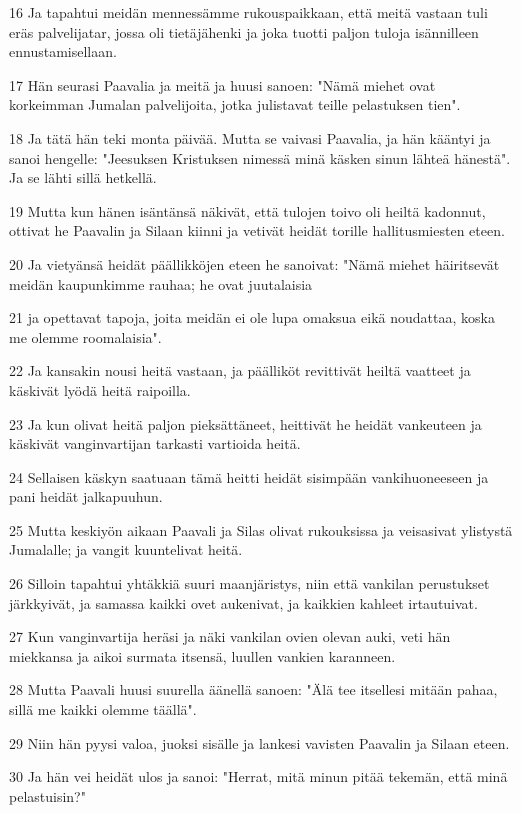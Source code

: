 \par 16 Ja tapahtui meidän mennessämme rukouspaikkaan, että meitä vastaan tuli eräs palvelijatar, jossa oli tietäjähenki ja joka tuotti paljon tuloja isännilleen ennustamisellaan.
\par 17 Hän seurasi Paavalia ja meitä ja huusi sanoen: "Nämä miehet ovat korkeimman Jumalan palvelijoita, jotka julistavat teille pelastuksen tien".
\par 18 Ja tätä hän teki monta päivää. Mutta se vaivasi Paavalia, ja hän kääntyi ja sanoi hengelle: "Jeesuksen Kristuksen nimessä minä käsken sinun lähteä hänestä". Ja se lähti sillä hetkellä.
\par 19 Mutta kun hänen isäntänsä näkivät, että tulojen toivo oli heiltä kadonnut, ottivat he Paavalin ja Silaan kiinni ja vetivät heidät torille hallitusmiesten eteen.
\par 20 Ja vietyänsä heidät päällikköjen eteen he sanoivat: "Nämä miehet häiritsevät meidän kaupunkimme rauhaa; he ovat juutalaisia
\par 21 ja opettavat tapoja, joita meidän ei ole lupa omaksua eikä noudattaa, koska me olemme roomalaisia".
\par 22 Ja kansakin nousi heitä vastaan, ja päälliköt revittivät heiltä vaatteet ja käskivät lyödä heitä raipoilla.
\par 23 Ja kun olivat heitä paljon pieksättäneet, heittivät he heidät vankeuteen ja käskivät vanginvartijan tarkasti vartioida heitä.
\par 24 Sellaisen käskyn saatuaan tämä heitti heidät sisimpään vankihuoneeseen ja pani heidät jalkapuuhun.
\par 25 Mutta keskiyön aikaan Paavali ja Silas olivat rukouksissa ja veisasivat ylistystä Jumalalle; ja vangit kuuntelivat heitä.
\par 26 Silloin tapahtui yhtäkkiä suuri maanjäristys, niin että vankilan perustukset järkkyivät, ja samassa kaikki ovet aukenivat, ja kaikkien kahleet irtautuivat.
\par 27 Kun vanginvartija heräsi ja näki vankilan ovien olevan auki, veti hän miekkansa ja aikoi surmata itsensä, luullen vankien karanneen.
\par 28 Mutta Paavali huusi suurella äänellä sanoen: "Älä tee itsellesi mitään pahaa, sillä me kaikki olemme täällä".
\par 29 Niin hän pyysi valoa, juoksi sisälle ja lankesi vavisten Paavalin ja Silaan eteen.
\par 30 Ja hän vei heidät ulos ja sanoi: "Herrat, mitä minun pitää tekemän, että minä pelastuisin?"
